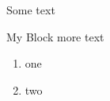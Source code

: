 \documentclass[11pt]{beamer}
\begin{document}
\begin{frame}
Some text
\begin{block}{My Block}
more text
\end{block}
\begin{enumerate}
\item one
\item two
\end{enumerate}
\end{frame}
\end{document}
